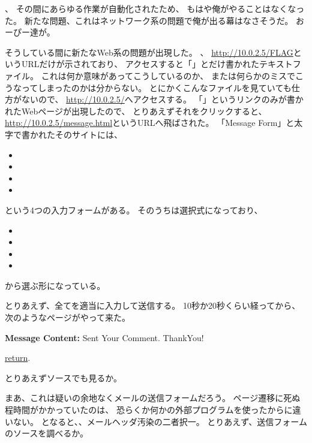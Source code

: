 、
その間にあらゆる作業が自動化されたため、
もはや俺がやることはなくなった。
新たな問題、これはネットワーク系の問題で俺が出る幕はなさそうだ。
おーぴー達が。

そうしている間に新たなWeb系の問題が出現した。
、
\url{http://10.0.2.5/FLAG}というURLだけが示されており、
アクセスすると「」とだけ書かれたテキストファイル。
これは何か意味があってこうしているのか、
または何らかのミスでこうなってしまったのかは分からない。
とにかくこんなファイルを見ていても仕方がないので、
\url{http://10.0.2.5/}へアクセスする。
「」というリンクのみが書かれたWebページが出現したので、
とりあえずそれをクリックすると、\url{http://10.0.2.5/message.html}というURLへ飛ばされた。
「Message Form」と太字で書かれたそのサイトには、

\begin{itemize}
	\item {}
	\item {}
	\item {}
	\item {}
\end{itemize}

という4つの入力フォームがある。
そのうちは選択式になっており、

\begin{itemize}
	\item {}
	\item {}
	\item {}
	\item {}
\end{itemize}

から選ぶ形になっている。

とりあえず、全てを適当に入力して送信する。
10秒か20秒くらい経ってから、次のようなページがやって来た。

\begin{itembox}[c]{\textbf{Message Content:}}
Sent Your Comment. ThankYou!

\underline{return}. 
\end{itembox}

とりあえずソースでも見るか。



まあ、これは疑いの余地なくメールの送信フォームだろう。
ページ遷移に死ぬ程時間がかかっていたのは、
恐らくか何かの外部プログラムを使ったからに違いない。
となると、、メールヘッダ汚染の二者択一。
とりあえず、送信フォームのソースを調べるか。

